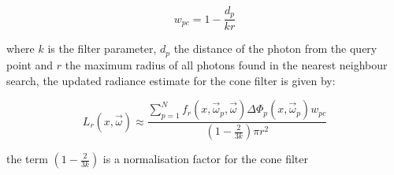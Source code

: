 \begin{equation}
w_{pc} = 1 - \frac{d_p}{k r}
\end{equation}

where $k$ is the filter parameter, $d_p$ the distance of the photon from the query point and $r$ the maximum radius of
all photons found in the nearest neighbour search, the updated radiance estimate for the cone filter is given by:

\begin{equation}
L_r(x, \vec{\omega}) \approx
\frac
{\sum\limits_{p=1}^N f_r(x, \vec{\omega}_p,\vec{\omega})\Delta \Phi_p(x,\vec{\omega}_p)w_{pc}}
{(1 - \frac{2}{3k})\pi r ^2}
\end{equation}

the term $(1 - \frac{2}{3k})$ is a normalisation factor for the cone filter \cite{Foley97}


